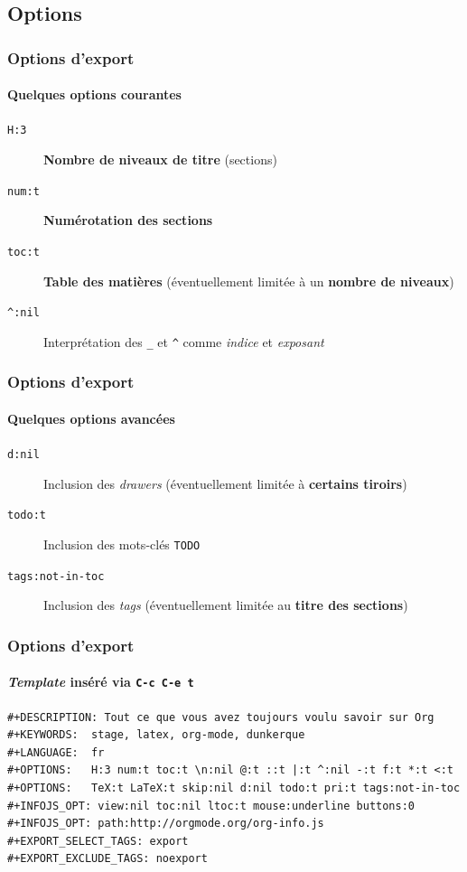 \documentclass[presentation,t,hideothersubsections]{beamer}
\providecommand{\alert}[1]{\textbf{#1}}
\begin{document}
\subsection{Options}
\label{sec-4-1}
\begin{frame}
\frametitle{Options d'export}
\framesubtitle{Quelques options courantes}
\label{sec-4-1-1}


\begin{description}
\item[\texttt{H:3}] \textbf{Nombre de niveaux de titre} (sections)
\item[\texttt{num:t}] \textbf{Numérotation des sections}
\item[\texttt{toc:t}] \textbf{Table des matières} (éventuellement limitée à un \alert{nombre de niveaux})
\item[\texttt{\textasciicircum{}:nil}] Interprétation des \texttt{\_} et \texttt{\textasciicircum{}} comme \emph{indice} et \emph{exposant}
\end{description}
\end{frame}
\begin{frame}
\frametitle{Options d'export}
\framesubtitle{Quelques options avancées}
\label{sec-4-1-2}


\begin{description}
\item[\texttt{d:nil}] Inclusion des \emph{drawers} (éventuellement limitée à \alert{certains tiroirs})
\item[\texttt{todo:t}] Inclusion des mots-clés \texttt{TODO}
\item[\texttt{tags:not-in-toc}] Inclusion des \emph{tags} (éventuellement limitée au \alert{titre des   sections})
\end{description}
\end{frame}
\begin{frame}[fragile]
\frametitle{Options d'export}
\framesubtitle{\emph{Template} inséré via \texttt{C-c C-e t}}
\label{sec-4-1-3}



\lstset{language=org}
\begin{lstlisting}
#+DESCRIPTION: Tout ce que vous avez toujours voulu savoir sur Org
#+KEYWORDS:  stage, latex, org-mode, dunkerque
#+LANGUAGE:  fr
#+OPTIONS:   H:3 num:t toc:t \n:nil @:t ::t |:t ^:nil -:t f:t *:t <:t
#+OPTIONS:   TeX:t LaTeX:t skip:nil d:nil todo:t pri:t tags:not-in-toc
#+INFOJS_OPT: view:nil toc:nil ltoc:t mouse:underline buttons:0
#+INFOJS_OPT: path:http://orgmode.org/org-info.js
#+EXPORT_SELECT_TAGS: export
#+EXPORT_EXCLUDE_TAGS: noexport
\end{lstlisting}
\end{frame}
\end{document}
